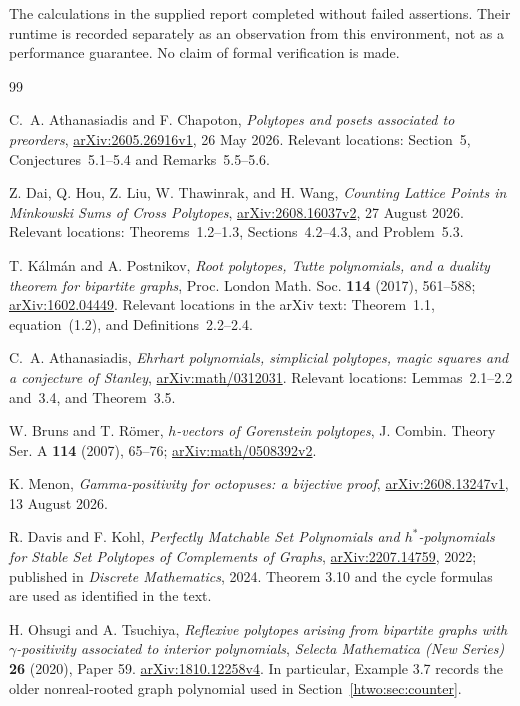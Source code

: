 \documentclass[11pt]{article}
\numberwithin{equation}{section}
\theoremstyle{definition}
\newcommand{\arxiv}[1]{\href{https://arxiv.org/abs/#1}{arXiv:#1}}
\begin{document}
The calculations in the supplied report completed without failed assertions.
Their runtime is recorded separately as an observation from this environment,
not as a performance guarantee. No claim of formal verification is made.

\begin{thebibliography}{99}

C.~A. Athanasiadis and F. Chapoton,
\emph{Polytopes and posets associated to preorders},
\arxiv{2605.26916v1}, 26 May 2026.
Relevant locations: Section~5, Conjectures~5.1--5.4 and Remarks~5.5--5.6.

Z. Dai, Q. Hou, Z. Liu, W. Thawinrak, and H. Wang,
\emph{Counting Lattice Points in Minkowski Sums of Cross Polytopes},
\arxiv{2608.16037v2}, 27 August 2026.
Relevant locations: Theorems~1.2--1.3, Sections~4.2--4.3, and Problem~5.3.

T. K\'alm\'an and A. Postnikov,
\emph{Root polytopes, Tutte polynomials, and a duality theorem for bipartite graphs},
Proc. London Math. Soc. \textbf{114} (2017), 561--588;
\arxiv{1602.04449}.
Relevant locations in the arXiv text: Theorem~1.1, equation~(1.2), and
Definitions~2.2--2.4.

C.~A. Athanasiadis,
\emph{Ehrhart polynomials, simplicial polytopes, magic squares and a conjecture of Stanley},
\arxiv{math/0312031}.
Relevant locations: Lemmas~2.1--2.2 and~3.4, and Theorem~3.5.

W. Bruns and T. R\"omer,
\emph{$h$-vectors of Gorenstein polytopes},
J. Combin. Theory Ser. A \textbf{114} (2007), 65--76;
\arxiv{math/0508392v2}.

K. Menon,
\emph{Gamma-positivity for octopuses: a bijective proof},
\arxiv{2608.13247v1}, 13 August 2026.

R. Davis and F. Kohl,
\emph{Perfectly Matchable Set Polynomials and $h^*$-polynomials for Stable
Set Polytopes of Complements of Graphs},
\arxiv{2207.14759}, 2022; published in \emph{Discrete Mathematics}, 2024.
Theorem 3.10 and the cycle formulas are used as identified in the text.

H. Ohsugi and A. Tsuchiya,
\emph{Reflexive polytopes arising from bipartite graphs with
$\gamma$-positivity associated to interior polynomials},
\emph{Selecta Mathematica (New Series)} \textbf{26} (2020), Paper 59.
\arxiv{1810.12258v4}. In particular, Example 3.7 records the older
nonreal-rooted graph polynomial used in Section~\ref{htwo:sec:counter}.


\end{thebibliography}
\end{document}
